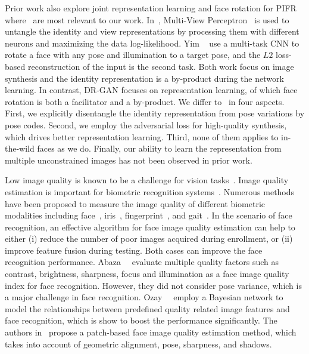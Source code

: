\documentclass[10pt,journal,compsoc]{IEEEtran}
\begin{document}
Prior work also explore joint representation learning and face rotation for PIFR where~\cite{zhu2014multi,yim2015rotating} are most relevant to our work. 
In~\cite{zhu2014multi}, Multi-View Perceptron~\cite{zhu2014multi} is used to untangle the identity and view representations by processing them with different neurons and maximizing the data log-likelihood. 
Yim \etal~\cite{yim2015rotating} use a multi-task CNN to rotate a face with any pose and illumination to a target pose, and the $L2$ loss-based reconstruction of the input is the second task.
%
Both work focus on image synthesis and the identity representation is a by-product during the network learning. 
In contrast, DR-GAN focuses on representation learning, of which face rotation is both a facilitator and a by-product.
We differ to~\cite{zhu2014multi,yim2015rotating} in four aspects. 
First, we explicitly disentangle the identity representation from pose variations by pose codes. 
Second, we employ the adversarial loss for high-quality synthesis, which drives better representation learning. 
Third, none of them applies to in-the-wild faces as we do. 
Finally, our ability to learn the representation from multiple unconstrained images has not been observed in prior work.

Low image quality is known to be a challenge for vision tasks~\cite{face-model-fitting-on-low-resolution-images, fsrnet-end-to-end-learning-face-super-resolution-with-facial-priors}.
%
Image quality estimation is important for biometric recognition systems~\cite{bharadwaj2014biometric,grother2007performance, tong2010improving}.
% 
Numerous methods have been proposed to measure the image quality of different biometric modalities including face~\cite{abaza2014design,abdel2007application,ozay2009improving}, iris~\cite{chen2006localized,krichen2007new}, fingerprint~\cite{tabassi2005novel,teixeira2016new}, and gait~\cite{muramatsu2016view,matovski2012including}. 
In the scenario of face recognition, 
%
an effective algorithm for face image quality estimation can help to either (i) reduce the number of poor images acquired during enrollment, or (ii) improve feature fusion during testing. 
%
Both cases can improve the face recognition performance. 
Abaza~\etal~\cite{abaza2014design} evaluate multiple quality factors such as contrast, brightness, sharpness, focus and illumination as a face image quality index for face recognition. 
However, they did not consider pose variance, which is a major challenge in face recognition. 
Ozay~\etal~\cite{ozay2009improving} employ a Bayesian network to model the relationships between predefined quality related image features and face recognition, which is show to boost the performance significantly. 
The authors in~\cite{wong2011patch} propose a patch-based face image quality estimation method, which takes into account of geometric alignment, pose, sharpness, and shadows. 
\end{document}
